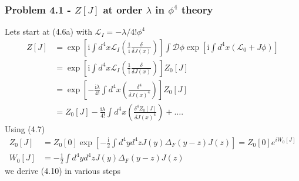 \documentclass[10pt,a4paper]{article}
\theoremstyle{definition}
\begin{document}
\subsubsection{Problem 4.1 - \texorpdfstring{$Z[J]$}{Lg} at order \texorpdfstring{$\lambda$}{Lg} in \texorpdfstring{$\phi^4$}{Lg} theory}
Lets start at (4.6a) with $\mathscr{L}_I=-\lambda/4!\phi^4$
\begin{align}
    Z[J]&=\exp\left[\text{i}\int d^4x\mathscr{L}_I\left(\frac{1}{\text{i}}\frac{\delta}{\delta J(x)}\right)\right]\int\mathcal{D}\phi\exp\left[\text{i}\int d^4x(\mathscr{L}_0+J\phi)\right]\\
    &=\exp\left[\text{i}\int d^4x\mathscr{L}_I\left(\frac{1}{\text{i}}\frac{\delta}{\delta J(x)}\right)\right]Z_0[J]\\
    &=\exp\left[-\frac{\text{i}\lambda}{4!}\int d^4x\left(\frac{\delta^4 }{\delta J(x)^4}\right)\right]Z_0[J]\\
    &=Z_0[J]-\frac{\text{i}\lambda}{4!}\int d^4x\left(\frac{\delta^4 Z_0[J]}{\delta J(x)^4}\right)+\dots.
\end{align}
Using (4.7)
\begin{align}
    Z_0[J]&=Z_0[0]\exp\left[-\frac{\text{i}}{2}\int d^4yd^4zJ(y)\Delta_F(y-z)J(z)\right]=Z_0[0]e^{iW_0[J]}\\
    W_0[J]&=-\frac{1}{2}\int d^4yd^4zJ(y)\Delta_F(y-z)J(z)
\end{align}
we derive (4.10) in various steps 
\end{document}
